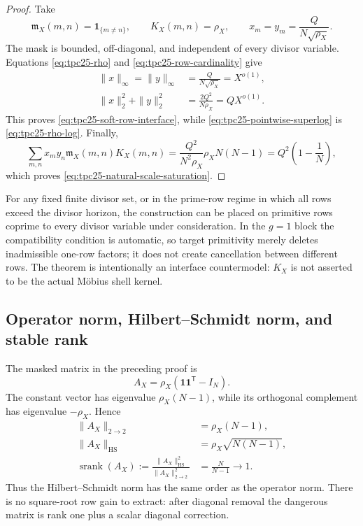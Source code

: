 \begin{proof}
Take
\begin{equation}
 \mathfrak m_X(m,n)=\mathbf 1_{\{m\ne n\}},
 \qquad
 K_X(m,n)=\rho_X,
 \qquad
 x_m=y_m=\frac{Q}{N\sqrt{\rho_X}}.
 \label{eq:tpc25-saturating-data}
\end{equation}
The mask is bounded, off-diagonal, and independent of every divisor
variable.  Equations \eqref{eq:tpc25-rho} and
\eqref{eq:tpc25-row-cardinality} give
\begin{align}
 \|x\|_\infty=\|y\|_\infty
 &=\frac{Q}{N\sqrt{\rho_X}}=X^{o(1)},
 \label{eq:tpc25-saturating-linfty}\\
 \|x\|_2^2+\|y\|_2^2
 &=\frac{2Q^2}{N\rho_X}=QX^{o(1)}.
 \label{eq:tpc25-saturating-ltwo}
\end{align}
This proves \eqref{eq:tpc25-soft-row-interface}, while
\eqref{eq:tpc25-pointwise-superlog} is
\eqref{eq:tpc25-rho-log}.  Finally,
\[
 \sum_{m,n}x_my_n\mathfrak m_X(m,n)K_X(m,n)
 =\frac{Q^2}{N^2\rho_X}\rho_X N(N-1)
 =Q^2\left(1-\frac1N\right),
\]
which proves \eqref{eq:tpc25-natural-scale-saturation}.
\end{proof}

For any fixed finite divisor set, or in the prime-row regime in which
all rows exceed the divisor horizon, the construction can be placed on
primitive rows coprime to every divisor variable under consideration.
In the \(g=1\) block the
compatibility condition is automatic, so target primitivity merely
deletes inadmissible one-row factors; it does not create cancellation
between different rows.  The theorem is intentionally an interface
countermodel: \(K_X\) is not asserted to be the actual M\"obius shell
kernel.

\subsection{Operator norm, Hilbert--Schmidt norm, and stable rank}

The masked matrix in the preceding proof is
\begin{equation}
 A_X=\rho_X(\mathbf1\mathbf1^{\mathsf T}-I_N).
 \label{eq:tpc25-rank-one-plus-diagonal}
\end{equation}
The constant vector has eigenvalue \(\rho_X(N-1)\), while its
orthogonal complement has eigenvalue \(-\rho_X\).  Hence
\begin{align}
 \|A_X\|_{2\to2}
 &=\rho_X(N-1),
 \label{eq:tpc25-op-norm}\\
 \|A_X\|_{\mathrm{HS}}
 &=\rho_X\sqrt{N(N-1)},
 \label{eq:tpc25-hs-norm}\\
 \operatorname{srank}(A_X)
 :=\frac{\|A_X\|_{\mathrm{HS}}^2}
 {\|A_X\|_{2\to2}^2}
 &=\frac{N}{N-1}\longrightarrow1.
 \label{eq:tpc25-stable-rank}
\end{align}
Thus the Hilbert--Schmidt norm has the same order as the operator norm.
There is no square-root row gain to extract: after diagonal removal the
dangerous matrix is rank one plus a scalar diagonal correction.

